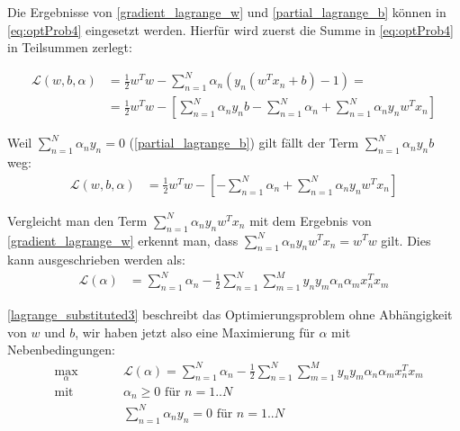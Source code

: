 \documentclass[a4paper,11pt,twoside]{scrreprt}
\newcommand{\Lagr}{\mathcal{L}}
\begin{document}
Die Ergebnisse von \autoref{gradient_lagrange_w} und \autoref{partial_lagrange_b} können in \autoref{eq:optProb4} eingesetzt werden. Hierfür wird zuerst die Summe in \autoref{eq:optProb4} in Teilsummen zerlegt:

\begin{equation} \label{lagrange_substituted}
	\begin{aligned}
		\Lagr(w, b, \alpha) &= \frac{1}{2} w^{T} w - \sum_{n=1}^{N} \alpha_{n} (y_n (w^{T} x_{n} + b)-1) = \\
		&= \frac{1}{2} w^{T} w - [\sum_{n=1}^{N} \alpha_{n} y_{n} b - \sum_{n=1}^{N} \alpha_{n} + \sum_{n=1}^{N} \alpha_{n} y_{n} w^{T} x_{n}]
	\end{aligned}
\end{equation}

Weil $\sum_{n=1}^{N} \alpha_{n} y_{n} = 0$ (\autoref{partial_lagrange_b}) gilt fällt der Term $\sum_{n=1}^{N} \alpha_{n} y_{n} b$ weg:
\begin{equation} \label{lagrange_substituted2}
	\begin{aligned}
		\Lagr(w, b, \alpha) &= \frac{1}{2} w^{T} w - [-\sum_{n=1}^{N} \alpha_{n} + \sum_{n=1}^{N} \alpha_{n} y_{n} w^{T} x_{n}]
	\end{aligned}
\end{equation}

Vergleicht man den Term $\sum_{n=1}^{N} \alpha_{n} y_{n} w^{T} x_{n}$ mit dem Ergebnis von \autoref{gradient_lagrange_w} erkennt man, dass $\sum_{n=1}^{N} \alpha_{n} y_{n} w^{T} x_{n} = w^T w$ gilt. Dies kann ausgeschrieben werden als:
\begin{equation} \label{lagrange_substituted3}
	\begin{aligned}
		\Lagr(\alpha) &= \sum_{n=1}^{N }\alpha_{n} - \frac{1}{2} \sum_{n=1}^{N} \sum_{m=1}^{M} y_{n} y_{m} \alpha_{n} \alpha_{m} x_{n}^{T} x_{m}
	\end{aligned}
\end{equation}

\autoref{lagrange_substituted3} beschreibt das Optimierungsproblem ohne Abhängigkeit von $w$ und $b$, wir haben jetzt also eine Maximierung für $\alpha$ mit Nebenbedingungen:
\begin{subequations} \label{final_lagrange}
	\begin{alignat}{2}
		&\!\max_{\alpha}        &\qquad&  	\Lagr(\alpha) = \sum_{n=1}^{N} \alpha_{n} - \frac{1}{2} \sum_{n=1}^{N} \sum_{m=1}^{M} y_{n} y_{m} \alpha_{n} \alpha_{m} x_{n}^{T} x_{m} \label{eq:optProb5}\\
		&\text{mit } &      & \alpha_{n} \geq 0 \text{ für } n=1..N \label{eq:constraint16}\\
		&       & & \sum_{n=1}^{N} \alpha_{n} y_{n} = 0\text{ für } n=1..N \label{eq:constraint17}
	\end{alignat}
\end{subequations}
\end{document}

